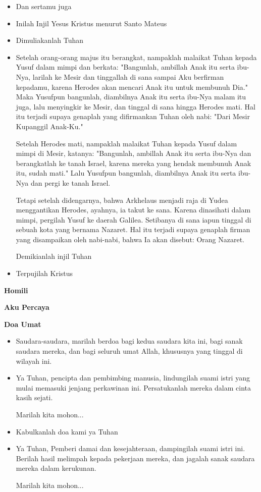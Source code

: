 \documentclass[a5paper,headsepline,titlepage,10pt,normalheadings,DIVcalc]{scrbook}
\makeatletter
\newcommand{\subjudul}[1]{%
  {\parindent \z@ \normalfont
    \interlinepenalty\@M \bfseries #1\par\nobreak \vskip 20\p@ }}
\newcommand{\BU}[1]{\begin{itemize} \item[U:] #1 \end{itemize}}
\newcommand{\BI}[1]{\begin{itemize} \item[I:] #1 \end{itemize}}
\newcommand{\BP}[1]{\begin{itemize} \item[P:] #1 \end{itemize}}
\makeatother
\begin{document}
\BU{Dan sertamu juga}

\BI{Inilah Injil Yesus Kristus menurut Santo Mateus}

\BU{Dimuliakanlah Tuhan}

\BI{
Setelah orang-orang majus itu berangkat, nampaklah malaikat Tuhan kepada Yusuf dalam mimpi dan berkata: "Bangunlah, ambillah Anak itu serta ibu-Nya, larilah ke Mesir dan tinggallah di sana sampai Aku berfirman kepadamu, karena Herodes akan mencari Anak itu untuk membunuh Dia."
Maka Yusufpun bangunlah, diambilnya Anak itu serta ibu-Nya malam itu juga, lalu menyingkir ke Mesir,
dan tinggal di sana hingga Herodes mati. Hal itu terjadi supaya genaplah yang difirmankan Tuhan oleh nabi: "Dari Mesir Kupanggil Anak-Ku."

Setelah Herodes mati, nampaklah malaikat Tuhan kepada Yusuf dalam mimpi di Mesir, katanya:
"Bangunlah, ambillah Anak itu serta ibu-Nya dan berangkatlah ke tanah Israel, karena mereka yang hendak membunuh Anak itu, sudah mati."
Lalu Yusufpun bangunlah, diambilnya Anak itu serta ibu-Nya dan pergi ke tanah Israel.

Tetapi setelah didengarnya, bahwa Arkhelaus menjadi raja di Yudea menggantikan Herodes, ayahnya, ia takut ke sana. Karena dinasihati dalam mimpi, pergilah Yusuf ke daerah Galilea.
Setibanya di sana iapun tinggal di sebuah kota yang bernama Nazaret. Hal itu terjadi supaya genaplah firman yang disampaikan oleh nabi-nabi, bahwa Ia akan disebut: Orang Nazaret.

Demikianlah injil Tuhan
}

\BU{Terpujilah Kristus}

\subjudul{Homili}


\subjudul{Aku Percaya}

\subjudul{Doa Umat}

\BI{Saudara-saudara, marilah berdoa bagi kedua saudara kita ini, bagi sanak saudara mereka, dan bagi seluruh umat Allah, khususnya yang tinggal di wilayah ini.}

\BP{Ya Tuhan, pencipta dan pembimbing manusia, lindungilah suami istri yang mulai memasuki jenjang perkawinan ini. Persatukanlah mereka dalam cinta kasih sejati. 

Marilah kita mohon...}

\BU{Kabulkanlah doa kami ya Tuhan}

\BP{Ya Tuhan, Pemberi damai dan kesejahteraan, dampingilah suami istri ini. Berilah hasil melimpah kepada pekerjaan mereka, dan jagalah sanak saudara mereka dalam kerukunan. 

Marilah kita mohon...}
\end{document}
